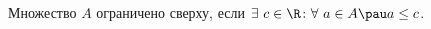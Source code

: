 
    Множество $A$ ограничено сверху, если $\exists\  c\in \R\colon \forall\  a\in A\pau a\leq c$.
 